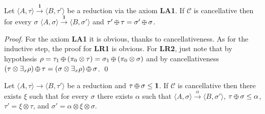 \documentclass{llncs}
\def\C{{\mathcal C}}
\newcommand{\comment}[1]{}
\def\monid{{\mathbf 0}}
\def\C{{\mathcal C}}
\def\odiv{\, {\ominus\hspace{-7.7pt} \div} \,}
\def\monid{\mathbf{1}}
\begin{document}
\begin{lemma}
\label{LA1}
Let $\langle A, \tau \rangle \xrightarrow{\monid} \langle B, \tau' \rangle$ be a reduction 
via the axiom {\bf LA1}. 
If $\C$ is cancellative then 
for every $\sigma$
$\langle A, \sigma \rangle \xrightarrow{\monid} \langle B, \sigma' \rangle$
and $\tau' \odiv \tau = \sigma' \odiv \sigma$.
\end{lemma}
\begin{proof}
For the axiom {\bf LA1} it is obvious,
thanks to cancellativeness.
As for the inductive step, the proof for 
{\bf LR1} is obvious. For {\bf LR2},
just note that by hypothesis 
$\rho = \tau_1 \odiv (\pi_0 \otimes \tau) = \sigma_1 \odiv (\pi_0 \otimes \sigma)$
and by cancellativeness 
$(\tau \otimes \exists_x \rho) \odiv \tau = (\sigma \otimes \exists_x \rho) \odiv \sigma$.
\qed
\end{proof}


\comment{
\begin{lemma}
\label{riminor}
Let $\langle A, \tau \rangle \xrightarrow{\beta} \langle B, \tau' \rangle$ with $\alpha \leq \beta$. 
%
If $\beta \neq \monid$ then $\langle A, \tau \rangle \xrightarrow{\alpha} \langle B, \tau' \otimes (\alpha \odiv \beta) \rangle$.
%
\end{lemma}

\todo{questo lemma ora serve?}
The lemma just states that the label in a reduction can always be strengthened,
as long as rule  {\bf LA1} is not used in the reduction labelled by $\beta$.
The proof exploits the premise of rule {\bf LA2} together with Lemma~\ref{l-mono},
and the condition $\beta \neq \monid$ is required in the inductive step for rule  {\bf LR2}.
}

\begin{theorem}[Completeness]
Let $\langle A, \tau \rangle \to \langle B, \tau' \rangle$ be a reduction
and $\tau \odiv \sigma \leq \monid$.
%
If $\C$ is cancellative then there exists $\xi$ such that
for every $\sigma$ 
there exists $\alpha$ such that 
$\langle A, \sigma \rangle \xrightarrow{\alpha} \langle B, \sigma' \rangle$,
$\tau \odiv \sigma \leq \alpha$,
$\tau' = \xi \otimes \tau$, and $\sigma' = \alpha \otimes \xi \otimes \sigma$.
\end{theorem}
\end{document}
